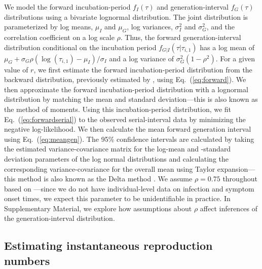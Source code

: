 \documentclass[12pt]{article}
\newcommand{\eref}[1]{Eq.~(\ref{eq:#1})}
\begin{document}
We model the forward incubation-period $f_I(\tau)$ and generation-interval $f_G(\tau)$ distributions using a bivariate lognormal distribution.
The joint distribution is parameterized by log means, $\mu_I$ and $\mu_G$, log variances, $\sigma_I^2$ and $\sigma_G^2$, and the correlation coefficient on a log scale $\rho$.
Thus, the forward generation-interval distribution conditional on the incubation period $f_{G|I}(\tau|\tau_{i,1})$ has a log mean of $\mu_G + \sigma_G \rho (\log(\tau_{i, 1}) - \mu_I)/\sigma_I$ and a log variance of $\sigma_G^2 (1 - \rho^2)$.
For a given value of $r$, we first estimate the forward incubation-period distribution from the backward distribution, previously estimated by \cite{backer2021omicron}, using \eref{forward}.
We then approximate the forward incubation-period distribution with a lognormal distribution by matching the mean and standard deviation---this is also known as the method of moments.
Using this incubation-period distribution, we fit \eref{forwardserial} to the observed serial-interval data by minimizing the negative log-likelihood.
We then calculate the mean forward generation interval using \eref{meangen}.
The 95\% confidence intervals are calculated by taking the estimated variance-covariance matrix for the log-mean and -standard deviation parameters of the log normal distributions and calculating the corresponding variance-covariance for the overall mean using Taylor expansion---this method is also known as the Delta method \citep{oehlert1992note}.
We assume $\rho = 0.75$ throughout based on \cite{sender2021unmitigated}---since we do not have individual-level data on infection and symptom onset times, we expect this parameter to be unidentifiable in practice.
In Supplementary Material, we explore how assumptions about $\rho$ affect inferences of the generation-interval distribution.

\subsection{Estimating instantaneous reproduction numbers}
\end{document}
